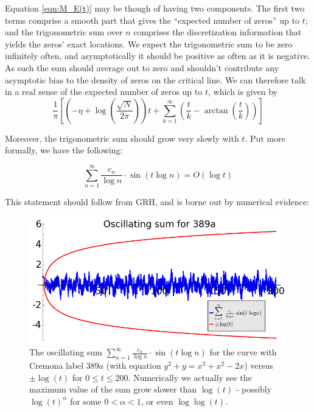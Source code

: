 \documentclass[10pt]{article}
\begin{document}
Equation \ref{eqn:M_E(t)} may be though of having two components. The first two terms comprise a smooth part that gives the ``expected number of zeros'' up to $t$; and the trigonometric sum over $n$ comprises the discretization information that yields the zeros' exact locations. We expect the trigonometric sum to be zero infinitely often, and asymptotically it should be positive as often as it is negative. As such the sum should average out to zero and shouldn't contribute any asymptotic bias to the density of zeros on the critical line. We can therefore talk in a real sense of the expected number of zeros up to $t$, which is given by
\begin{equation}\label{eqn:M_E_smooth_part}
\frac{1}{\pi}\left[\left(-\eta+\log\left(\frac{\sqrt{N}}{2\pi}\right)\right) t + \sum_{k=1}^{\infty} \left(\frac{t}{k} - \arctan\left(\frac{t}{k}\right)\right)\right]
\end{equation}

Moreover, the trigonometric sum should grow very slowly with $t$. Put more formally, we have the following:
\begin{conjecture}\label{conj:trig_sum_size}
\begin{equation}
\sum_{n=1}^{\infty} \frac{c_n}{\log n}\cdot \sin(t\log n) = O(\log t)
\end{equation}
\end{conjecture}
This statement should follow from GRH, and is borne out by numerical evidence:

\begin{figure}[!h]
    \centering
    \includegraphics[width=1.0\textwidth]{graphics/M_E_trig_sum_bounds.png}
    \caption{The oscillating sum $\sum_{n=1}^{\infty} \frac{c_n}{\log n}\cdot \sin(t\log n)$ for the curve with Cremona label $389a$ (with equation $y^2 + y = x^3 + x^2 - 2x$) versus $\pm \log(t)$ for $0\le t \le 200$. Numerically we actually see the maximum value of the sum grow slower than $\log(t)$ - possibly $\log(t)^{\alpha}$ for some $0<\alpha<1$, or even $\log\log(t)$.}
    \label{fig:M_E_trig_sum_bounds}
\end{figure}
\end{document}
